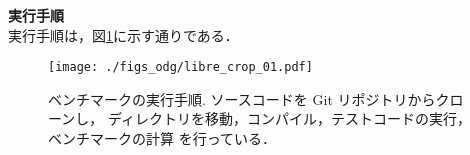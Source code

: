 {\bf 実行手順}
\samepage \\ \indent
実行手順は，図\ref{fig_command}に示す通りである．
\vspace{-2mm}
\begin{figure}[h]
  \hspace{2mm}
  \texttt{[image: ./figs\_odg/libre\_crop\_01.pdf]}
  \caption{
    ベンチマークの実行手順.
    ソースコードを Git リポジトリからクローンし，
    ディレクトリを移動，コンパイル，テストコードの実行，ベンチマークの計算
    を行っている．
  }
  \label{fig_command}
\end{figure}

